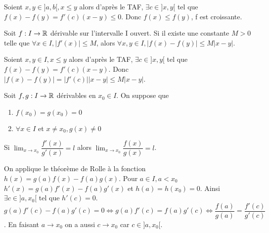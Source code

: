 \documentclass[a4paper, 12pt]{article}
\begin{document}
\begin{demonstration}
    Soient $x, y \in ]a, b[, x \leq y$ alors d'après le TAF, $\exists c \in ]x, y[$ tel que $f(x) - f(y) = f'(c)(x - y) \leq 0$.
    Donc $f(x) \leq f(y)$, f est croissante.
\end{demonstration}

\begin{corollaire}
    Soit $f: I \rightarrow \mathbb{R}$ dérivable sur l'intervalle I ouvert. Si il existe une constante
    $M \gt 0$ telle que $\forall x \in I, |f'(x)| \leq M$, alors $\forall x, y \in I, |f(x) - f(y)| \leq M|x - y|$.
\end{corollaire}

\begin{demonstration}
    Soient $x, y \in I, x \leq y$ alors d'après le TAF, $\exists c \in ]x, y[$ tel que $f(x) - f(y) = f'(c)(x - y)$.
    Donc $|f(x) - f(y)| = |f'(c)||x - y| \leq M|x - y|$.
\end{demonstration}

\begin{corollaire}
    Soit $f, g: I \rightarrow \mathbb{R}$ dérivables en $x_0 \in I$. On suppose que 
    \begin{enumerate}
        \item $f(x_0) = g(x_0) = 0$
        \item $\forall x \in I$ et $x \neq x_0, g(x) \neq 0$
    \end{enumerate}
    Si $\lim_{x \to x_0} \dfrac{f'(x)}{g'(x)} = l$ alors $\lim_{x \to x_0} \dfrac{f(x)}{g(x)} = l$.
\end{corollaire}

\begin{demonstration}
    On applique le théorème de Rolle à la fonction $h(x) = g(a)f(x) - f(a)g(x)$.
    Pour $a \in I, a \lt x_0$
    $h'(x) = g(a)f'(x) - f(a)g'(x)$ et $h(a) = h(x_0) = 0$.
    Ainsi $\exists c \in ]a, x_0[$ tel que $h'(c) = 0$.
    $g(a)f'(c) - f(a)g'(c) = 0 \iff g(a)f'(c) = f(a)g'(c) \iff \dfrac{f(a)}{g(a)} = \dfrac{f'(c)}{g'(c)}$.
    En faisant $a \to x_0$ on a aussi $c \to x_0$ car $c \in ]a, x_0[$.
\end{demonstration}
\end{document}
